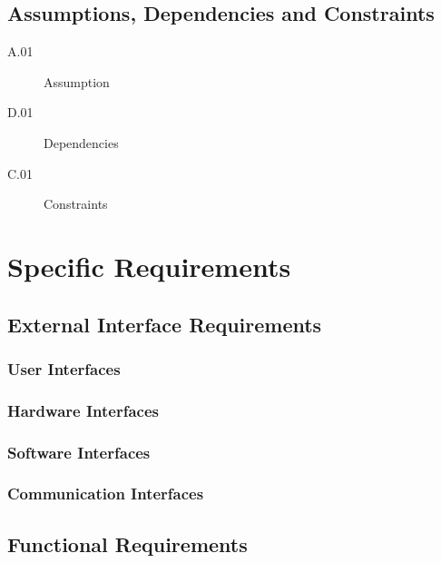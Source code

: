 \documentclass[a4paper]{article}
\begin{document}
    \subsection{Assumptions, Dependencies and Constraints}
        \begin{description}
            \item[A.01] Assumption
        \end{description}
        
        \begin{description}
            \item[D.01] Dependencies
        \end{description}
        
        \begin{description}
            \item[C.01] Constraints
        \end{description}
\newpage
\section{Specific Requirements}

    \subsection{External Interface Requirements}
        
        \subsubsection{User Interfaces}
        
        \subsubsection{Hardware Interfaces}
        
        \subsubsection{Software Interfaces}
        
        \subsubsection{Communication Interfaces}
    
    \subsection{Functional Requirements}
        
\end{document}
